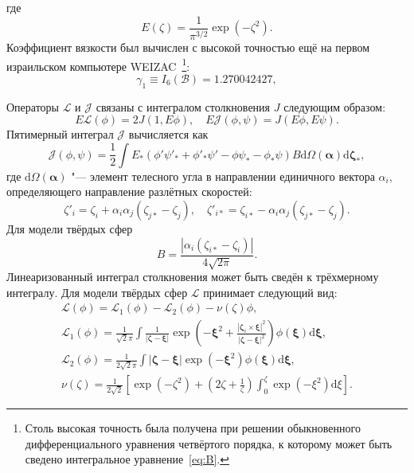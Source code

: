 \documentclass[a4paper,12pt]{article}
\newcommand{\dd}{\mathrm{d}}
\newcommand{\dzeta}{\boldsymbol{\dd\zeta}}
\newcommand{\dxi}{\boldsymbol{\dd\xi}}
\newcommand{\bzeta}{\boldsymbol{\zeta}}
\newcommand{\bxi}{\boldsymbol{\xi}}
\begin{document}
где
\begin{equation}\label{eq:E}
    E(\zeta) = \frac1{\pi^{3/2}}\exp\left(-\zeta^2\right).
\end{equation}
Коэффициент вязкости был вычислен с высокой точностью ещё на первом израильском компьютере WEIZAC~\cite{Pekeris1957}\footnote{
    Столь высокая точность была получена при решении обыкновенного дифференциального уравнения четвёртого порядка,
    к которому может быть сведено интегральное уравнение~\eqref{eq:B}.
}:
\begin{equation}\label{eq:gamma1}
    \gamma_1 \equiv I_6(\mathcal{B}) = 1.270042427,
\end{equation}

Операторы \(\mathcal{L}\) и \(\mathcal{J}\) связаны с интегралом столкновения \(J\) следующим образом:
\begin{equation}\label{eq:mathcalLJ}
    E\mathcal{L}(\phi) = 2J(1, E\phi), \quad E\mathcal{J}(\phi, \psi) = J(E\phi, E\psi).
\end{equation}
Пятимерный интеграл \(\mathcal{J}\) вычисляется как
\begin{equation}\label{eq:mathcalJ}
    \mathcal{J}(\phi,\psi) = \frac12 \int E_*(\phi'\psi'_* + \phi'_*\psi' - \phi\psi_* - \phi_*\psi) B
    \dd \Omega(\boldsymbol{\alpha}) \dzeta_*,
\end{equation}
где \(\dd \Omega(\boldsymbol{\alpha})\) "--- элемент телесного угла в направлении единичного вектора \(\alpha_i\),
определяющего направление разлётных скоростей:
\begin{equation}\label{scatter_velocities}
    \zeta'_i = \zeta_i + \alpha_i\alpha_j(\zeta_{j*}-\zeta_j), \quad
    \zeta'_{i*} = \zeta_{i*} - \alpha_i\alpha_j(\zeta_{j*}-\zeta_j).
\end{equation}
Для модели твёрдых сфер
\begin{equation}
    B = \frac{|\alpha_i(\zeta_{i*}-\zeta_i)|}{4\sqrt{2\pi}}.
\end{equation}
Линеаризованный интеграл столкновения может быть сведён к трёхмерному интегралу.
Для модели твёрдых сфер \(\mathcal{L}\) принимает следующий вид:
\begin{gather}
    \mathcal{L}(\phi) = \mathcal{L}_1(\phi) - \mathcal{L}_2(\phi) - \nu(\zeta)\phi, \label{eq:linear_canonic}\\[6pt]
    \mathcal{L}_1(\phi) = \frac1{\sqrt2\pi} \int \frac1{|\bzeta-\bxi|}
        \exp\left(-\bxi^2 + \frac{|\bzeta_i\times\bxi|^2}{|\bzeta-\bxi|^2}\right) \phi(\bxi) \dxi, \label{eq:linear1}\\
    \mathcal{L}_2(\phi) = \frac1{2\sqrt2\pi} \int |\bzeta-\bxi|\exp\left(-\bxi^2\right) \phi(\bxi) \dxi, \label{eq:linear2}\\
    \nu(\zeta) = \frac1{2\sqrt2}\left[ \exp\left(-\zeta^2\right) + \left(2\zeta+\frac1\zeta\right)
        \int_0^\zeta\exp\left(-\xi^2\right)\dd\xi \right]. \label{eq:linear_nu}
\end{gather}
\end{document}
